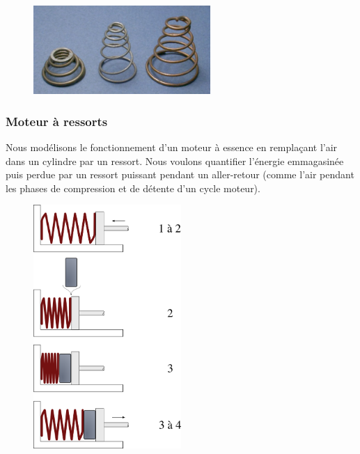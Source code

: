 	\begin{figure}
		\begin{center}
			\includegraphics[width=0.6\textwidth]{images/ressorts_coniques.jpg}
		\end{center}
		\label{fig_ressorts_coniques}
	\end{figure}
	

\subsubsection{Moteur à ressorts}
\label{exo_ressorts_moteur}

	
	Nous modélisons le fonctionnement d’un moteur à essence en remplaçant l’air dans un cylindre par un ressort. Nous voulons quantifier l’énergie emmagasinée puis perdue par un ressort puissant pendant un aller-retour (comme l’air pendant les phases de compression et de détente d’un cycle moteur).

	\begin{figure}
	\begin{center}
		\includegraphics[width=0.5\textwidth]{images/piston_ressorts.png}
	\end{center}
	\label{fig_pistons_ressorts}
	\end{figure}

